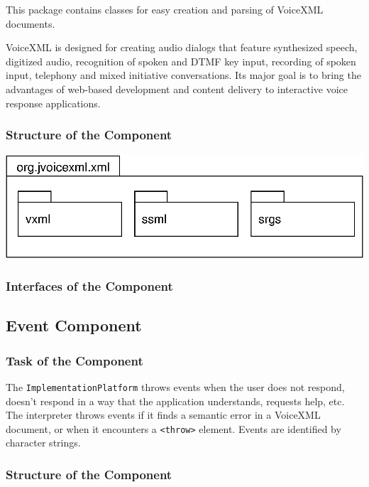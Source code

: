 \documentclass[11pt,a4paper]{article}
\begin{document}
This package contains classes for easy creation and parsing of VoiceXML
documents.

VoiceXML is designed for creating audio dialogs that feature synthesized
speech, digitized audio, recognition of spoken and DTMF key input, recording
of spoken input, telephony and mixed initiative conversations. Its major goal
is to bring the advantages of web-based development and content delivery to
interactive voice response applications.

\subsubsection{Structure of the Component}

\begin{center}
\includegraphics{package-org.jvoicexml.xml.eps}
\end{center}

\subsubsection{Interfaces of the Component}

\subsection{Event Component}
\label{sec:event-component}

\subsubsection{Task of the Component}

The \texttt{ImplementationPlatform} throws events when the user does not 
respond, doesn't respond in a way that the application understands, requests 
help, etc. The interpreter
throws events if it finds a semantic error in a VoiceXML document, or when it
encounters a \texttt{<throw>} element. Events are identified by
character strings.

\subsubsection{Structure of the Component}
\end{document}
